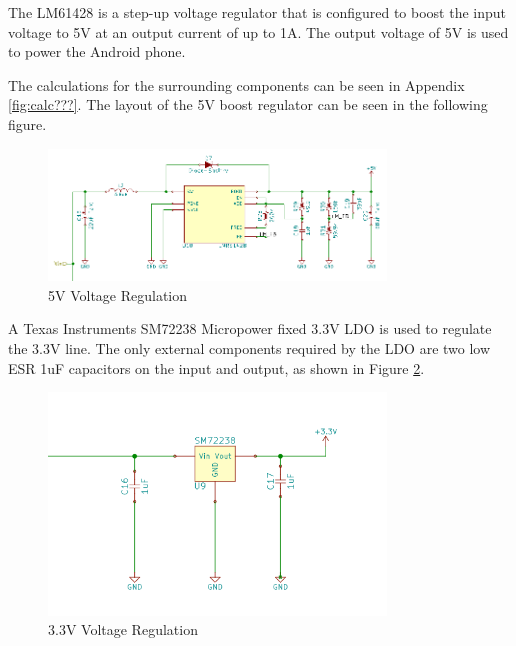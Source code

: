 \documentclass{article}
\numberwithin{figure}{section}
\numberwithin{equation}{section}
\begin{document}
{\bigskip
The LM61428 is a step-up voltage regulator that is configured to boost the input voltage to 5V at an output current of up to 1A. The output voltage of 5V is used to power the Android phone.


\bigskip
The calculations for the surrounding components can be seen in Appendix \ref{fig:calc???}. The layout of the 5V boost regulator can be seen in the following figure.
\begin{figure}[H]
	\centering
	\includegraphics[width=0.8\textwidth]{PS5V}
	\caption{5V Voltage Regulation}
	\label{fig:ps5}
\end{figure}

\bigskip
A Texas Instruments SM72238 Micropower fixed 3.3V LDO is used to regulate the 3.3V line. The only external components required by the LDO are two low ESR 1uF capacitors on the input and output, as shown in Figure \ref{fig:ps3}.

\begin{figure}[H]
	\centering
	\includegraphics[width=0.8\textwidth]{PS3V}
	\caption{3.3V Voltage Regulation}
	\label{fig:ps3}
\end{figure}


}
\end{document}
